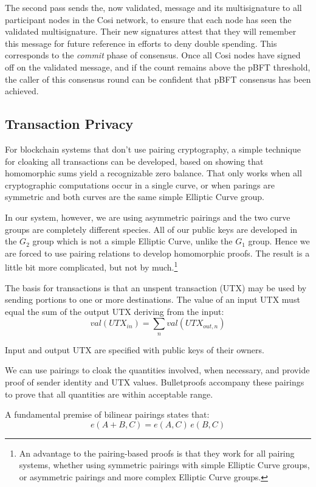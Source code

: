 \documentclass{yellowpaper}
\begin{document}
The second pass sends the, now validated, message and its multisignature to all participant nodes in the Cosi network, to ensure that each node has seen the validated multisignature. Their new signatures attest that they will remember this message for future reference in efforts to deny double spending. This corresponds to the {\em{commit}} phase of consensus. Once all Cosi nodes have signed off on the validated message, and if the count remains above the pBFT threshold, the caller of this consensus round can be confident that pBFT consensus has been achieved.
\subsection{Transaction Privacy}
For blockchain systems that don't use pairing cryptography, a simple technique for cloaking all transactions can be developed, based on showing that homomorphic sums yield a recognizable zero balance. That only works when all cryptographic computations occur in a single curve, or when parings are symmetric and both curves are the same simple Elliptic Curve group.

In our system, however, we are using asymmetric pairings and the two curve groups are completely different species. All of our public keys are developed in the $G_2$ group which is not a simple Elliptic Curve, unlike the $G_1$ group. Hence we are forced to use pairing relations to develop homomorphic proofs. The result is a little bit more complicated, but not by much.\footnote{An advantage to the pairing-based proofs is that they work for all pairing systems, whether using symmetric pairings with simple Elliptic Curve groups, or asymmetric pairings and more complex Elliptic Curve groups.}

The basis for transactions is that an unspent transaction (UTX) may be used by sending portions to one or more destinations. The value of an input UTX must equal the sum of the output UTX deriving from the input: 
$$val(UTX_{in}) = \sum_n val(UTX_{out,n})$$

Input and output UTX are specified with public keys of their owners. 

We can use pairings to cloak the quantities involved, when necessary, and provide proof of sender identity and UTX values. Bulletproofs accompany these pairings to prove that all quantities are within acceptable range.

A fundamental premise of bilinear pairings states that:
$$ e(A +  B, C) = e(A,C)\, e(B,C)$$
\end{document}

